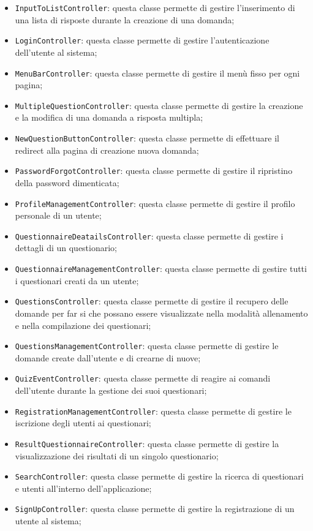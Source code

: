 \begin{itemize}
\begin{itemize}
		\item \texttt{InputToListController}: questa classe permette di gestire l'inserimento di una lista di risposte durante la creazione di una domanda;
		\item \texttt{LoginController}: questa classe permette di gestire l'autenticazione dell'utente al sistema;
		\item \texttt{MenuBarController}: questa classe permette di gestire il menù fisso per ogni pagina;
		\item \texttt{MultipleQuestionController}: questa classe permette di gestire la creazione e la modifica di una domanda a risposta multipla;
		\item \texttt{NewQuestionButtonController}: questa classe permette di effettuare il redirect alla pagina di creazione nuova domanda;
		\item \texttt{PasswordForgotController}: questa classe permette di gestire il ripristino della password dimenticata;
		\item \texttt{ProfileManagementController}: questa classe permette di gestire il profilo personale di un utente;
		\item \texttt{QuestionnaireDeatailsController}: questa classe permette di gestire i dettagli di un questionario;
		\item \texttt{QuestionnaireManagementController}: questa classe permette di gestire tutti i questionari creati da un utente;
		\item \texttt{QuestionsController}: questa classe permette di gestire il recupero delle domande per far si che possano essere visualizzate nella modalità allenamento e nella compilazione dei questionari;
		\item \texttt{QuestionsManagementController}: questa classe permette di gestire le domande create dall'utente e di crearne di nuove;
		\item \texttt{QuizEventController}: questa classe permette di reagire ai comandi dell'utente durante la gestione dei suoi questionari;
		\item \texttt{RegistrationManagementController}: questa classe permette di gestire le iscrizione degli utenti ai questionari;
		\item \texttt{ResultQuestionnaireController}: questa classe permette di gestire la visualizzazione dei risultati di un singolo questionario;
		\item \texttt{SearchController}: questa classe permette di gestire la ricerca di questionari e utenti all'interno dell'applicazione;
		\item \texttt{SignUpController}: questa classe permette di gestire la registrazione di un utente al sistema;

\end{itemize}
\end{itemize}
